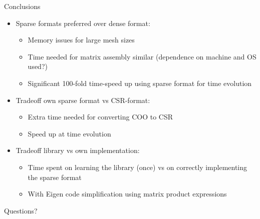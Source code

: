\documentclass[aspectratio=169,xcolor=dvipsnames]{beamer}
\begin{document}
\begin{frame}{Conclusions}
   \begin{itemize}
      \item Sparse formats preferred over dense format:
   	 \begin{itemize}
   	  \item Memory issues for large mesh sizes
	  \item Time needed for matrix assembly similar (dependence on machine and OS used?)
	  \item Significant 100-fold time-speed up using sparse format for time evolution
     \end{itemize}
   	 \item Tradeoff own sparse format vs CSR-format:
   	 \begin{itemize}
	  \item Extra time needed for converting COO to CSR 
	  \item Speed up at time evolution
	  
	  \end{itemize}
	  \item Tradeoff library vs own implementation:
	  \begin{itemize}
	  \item Time spent on learning the library (once) vs on correctly implementing the sparse format
	  \item With Eigen code simplification using matrix product expressions
	  \end{itemize}
   \end{itemize}
\end{frame}


\begin{frame}
    \Huge{\centerline{Questions?}}
\end{frame}
\end{document}
